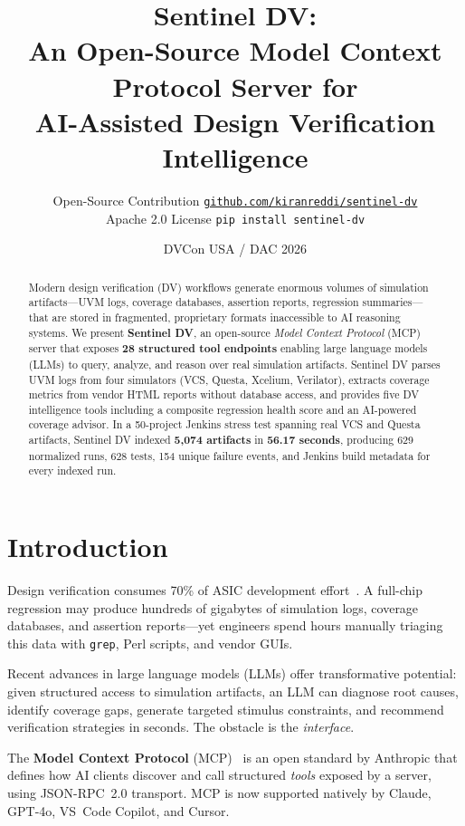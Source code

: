 \documentclass[10pt,twocolumn]{article}
\title{%
  \vspace{-1.5em}
  {\large\color{codeblue}\textbf{Sentinel DV:}}\\[2pt]
  \Large\textbf{An Open-Source Model Context Protocol Server for}\\
  \Large\textbf{AI-Assisted Design Verification Intelligence}
}
\author{%
  \normalsize Open-Source Contribution \quad
  \href{https://github.com/kiranreddi/sentinel-dv}{\texttt{github.com/kiranreddi/sentinel-dv}}\\
  \small Apache 2.0 License \quad \texttt{pip install sentinel-dv}
}
\date{DVCon USA / DAC 2026}
\begin{document}
\maketitle
\thispagestyle{fancy}

\begin{abstract}
Modern design verification (DV) workflows generate enormous volumes of simulation
artifacts---UVM logs, coverage databases, assertion reports, regression
summaries---that are stored in fragmented, proprietary formats inaccessible to AI
reasoning systems. We present \textbf{Sentinel DV}, an open-source
\emph{Model Context Protocol} (MCP) server that exposes \textbf{28 structured tool
endpoints} enabling large language models (LLMs) to query, analyze, and reason
over real simulation artifacts. Sentinel DV parses UVM logs from four simulators (VCS, Questa, Xcelium, Verilator), extracts coverage metrics from vendor HTML
reports without database access, and provides five DV intelligence tools including
a composite regression health score and an AI-powered coverage advisor. In a
50-project Jenkins stress test spanning real VCS and Questa artifacts, Sentinel
DV indexed \textbf{5,074 artifacts} in \textbf{56.17 seconds}, producing 629
normalized runs, 628 tests, 154 unique failure events, and Jenkins build
metadata for every indexed run.
\end{abstract}

\section{Introduction}

Design verification consumes 70\% of ASIC development effort~\cite{foster2015}.
A full-chip regression may produce hundreds of gigabytes of simulation logs,
coverage databases, and assertion reports---yet engineers spend hours manually
triaging this data with \texttt{grep}, Perl scripts, and vendor GUIs.

Recent advances in large language models (LLMs) offer transformative potential:
given structured access to simulation artifacts, an LLM can diagnose root causes,
identify coverage gaps, generate targeted stimulus constraints, and recommend
verification strategies in seconds. The obstacle is the \emph{interface}.

The \textbf{Model Context Protocol} (MCP)~\cite{mcp2024} is an open standard by
Anthropic that defines how AI clients discover and call structured \emph{tools}
exposed by a server, using JSON-RPC~2.0 transport. MCP is now supported natively
by Claude, GPT-4o, VS~Code Copilot, and Cursor.
\end{document}
